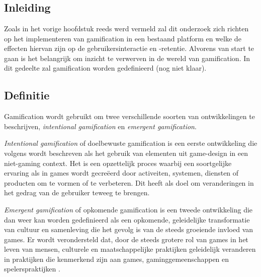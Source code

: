 \chapter{}
\label{ch:stand-van-zaken}



\section{Inleiding}

Zoals in het vorige hoofdstuk reeds werd vermeld zal dit onderzoek zich richten op het implementeren van gamification in een bestaand platform en welke de effecten hiervan zijn op de gebruikersinteractie en -retentie. Alvorens van start te gaan is het belangrijk om inzicht te verwerven in de wereld van gamification. In dit gedeelte zal gamification worden gedefinieerd (nog niet klaar).

\section{Definitie}

Gamification wordt gebruikt om twee verschillende soorten van ontwikkelingen te beschrijven, \textit{intentional gamification} en \textit{emergent gamification}.

\textit{Intentional gamification} of doelbewuste gamification is een eerste ontwikkeling die volgens \textcite{Deterding2011} wordt beschreven als het gebruik van elementen uit game-design in een niet-gaming context. Het is een opzettelijk proces waarbij een soortgelijke ervaring als in games wordt gecreëerd door activeiten, systemen, diensten of producten om te vormen of te verbeteren. Dit heeft als doel om veranderingen in het gedrag van de gebruiker teweeg te brengen.

\textit{Emergent gamification} of opkomende gamification is een tweede ontwikkeling die dan weer kan worden gedefinieerd als een opkomende, geleidelijke transformatie van cultuur en samenleving die het gevolg is van de steeds groeiende invloed van games. Er wordt verondersteld dat, door de steeds grotere rol van games in het leven van mensen, culturele en maatschappelijke praktijken geleidelijk veranderen in praktijken die kenmerkend zijn aan games, gaminggemeenschappen en spelerspraktijken  \autocite{Hamari2019}.

